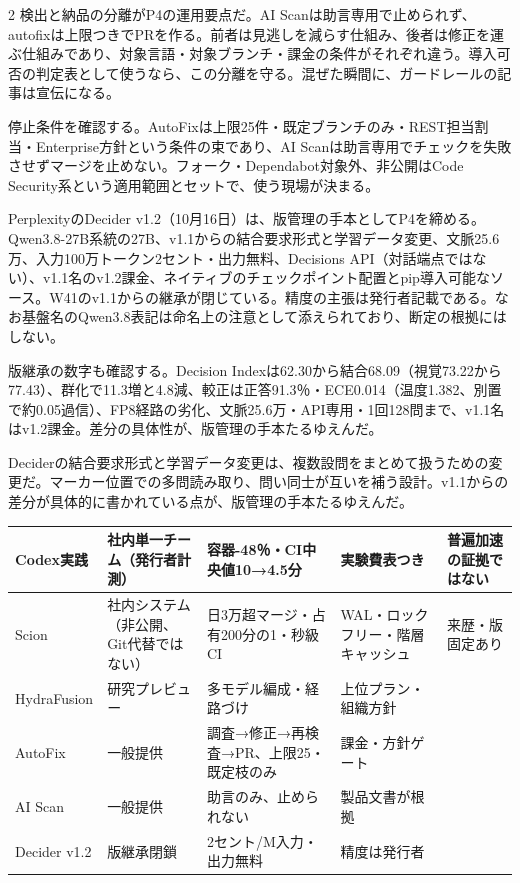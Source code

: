 \documentclass[lualatex,a4paper,10pt]{jlreq}
\begin{document}
\begin{multicols}{2}
検出と納品の分離がP4の運用要点だ。AI Scanは助言専用で止められず、autofixは上限つきでPRを作る。前者は見逃しを減らす仕組み、後者は修正を運ぶ仕組みであり、対象言語・対象ブランチ・課金の条件がそれぞれ違う。導入可否の判定表として使うなら、この分離を守る。混ぜた瞬間に、ガードレールの記事は宣伝になる。
\cite{B34,B77,B35,B78}


停止条件を確認する。AutoFixは上限25件・既定ブランチのみ・REST担当割当・Enterprise方針という条件の束であり、AI Scanは助言専用でチェックを失敗させずマージを止めない。フォーク・Dependabot対象外、非公開はCode Security系という適用範囲とセットで、使う現場が決まる。
\cite{B34,B77,B35,B78}


PerplexityのDecider v1.2（10月16日）は、版管理の手本としてP4を締める。Qwen3.8-27B系統の27B、v1.1からの結合要求形式と学習データ変更、文脈25.6万、入力100万トークン2セント・出力無料、Decisions API（対話端点ではない）、v1.1名のv1.2課金、ネイティブのチェックポイント配置とpip導入可能なソース。W41のv1.1からの継承が閉じている。精度の主張は発行者記載である。なお基盤名のQwen3.8表記は命名上の注意として添えられており、断定の根拠にはしない。
\cite{B37,B36,B38}


版継承の数字も確認する。Decision Indexは62.30から結合68.09（視覚73.22から77.43）、群化で11.3増と4.8減、較正は正答91.3％・ECE0.014（温度1.382、別置で約0.05過信）、FP8経路の劣化、文脈25.6万・API専用・1回128問まで、v1.1名はv1.2課金。差分の具体性が、版管理の手本たるゆえんだ。
\cite{B37,B36,B38}


Deciderの結合要求形式と学習データ変更は、複数設問をまとめて扱うための変更だ。マーカー位置での多問読み取り、問い同士が互いを補う設計。v1.1からの差分が具体的に書かれている点が、版管理の手本たるゆえんだ。
\cite{B37,B36,B38}


\end{multicols} %

{\centering\footnotesize
{}
\begin{tabularx}{0.96\linewidth}{@{}lXXXX@{}}
\toprule
Codex実践 & 社内単一チーム（発行者計測） & 容器-48％・CI中央値10→4.5分 & 実験費表つき & 普遍加速の証拠ではない \cite{B31} \\
\midrule
Scion & 社内システム（非公開、Git代替ではない） & 日3万超マージ・占有200分の1・秒級CI & WAL・ロックフリー・階層キャッシュ & 来歴・版固定あり \cite{B32,B75} \\
\midrule
HydraFusion & 研究プレビュー & 多モデル編成・経路づけ & 上位プラン・組織方針 \cite{B33,B76} \\
\midrule
AutoFix & 一般提供 & 調査→修正→再検査→PR、上限25・既定枝のみ & 課金・方針ゲート \cite{B34,B77} \\
\midrule
AI Scan & 一般提供 & 助言のみ、止められない & 製品文書が根拠 \cite{B35,B78} \\
\midrule
Decider v1.2 & 版継承閉鎖 & 2セント/M入力・出力無料 & 精度は発行者 \cite{B37,B36,B38} \\
\bottomrule
\end{tabularx}
} %
\end{document}
